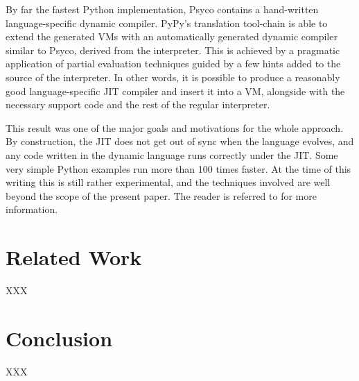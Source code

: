 \documentclass{llncs}
\begin{document}
By far the fastest Python implementation, Psyco \cite{Psyco} contains a
hand-written language-specific dynamic compiler.  PyPy's translation
tool-chain is able to extend the generated VMs with an automatically
generated dynamic compiler similar to Psyco, derived from the
interpreter.  This is achieved by a pragmatic application of partial
evaluation techniques guided by a few hints added to the source of the
interpreter.  In other words, it is possible to produce a reasonably
good language-specific JIT compiler and insert it into a VM, alongside
with the necessary support code and the rest of the regular interpreter.

This result was one of the major goals and motivations for the whole
approach.  By construction, the JIT does not get out of sync when the
language evolves, and any code written in the dynamic language runs
correctly under the JIT.  Some very simple Python examples run more than
100 times faster.  At the time of this writing this is still rather
experimental, and the techniques involved are well beyond the scope of
the present paper.  The reader is referred to \cite{D08.2} for more
information.







\section{Related Work}
XXX

\section{Conclusion}
XXX 


\end{document}
